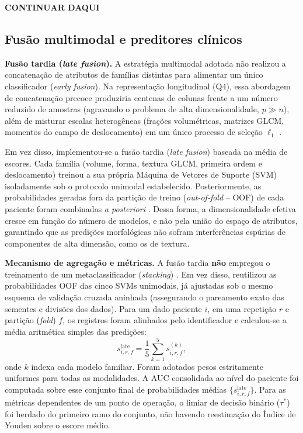 \documentclass[review]{elsarticle}
\newcommand{\sugestao}[2]{%
	\textcolor{red}{\sout{\textbf{#1}}}%
	\textcolor{blue!100!black}{\textbf{#2}}%
}
\begin{document}
\sugestao{}{CONTINUAR DAQUI}

\subsection{Fusão multimodal e preditores clínicos}
\label{sec:fusao}

\textbf{Fusão tardia (\emph{late fusion}).} A estratégia multimodal adotada não realizou a concatenação de atributos de famílias distintas para alimentar um único classificador (\emph{early fusion}). Na representação longitudinal (Q4), essa abordagem de concatenação precoce produziria centenas de colunas frente a um número reduzido de amostras (agravando o problema de alta dimensionalidade, $p \gg n$), além de misturar escalas heterogêneas (frações volumétricas, matrizes GLCM, momentos do campo de deslocamento) em um único processo de seleção $\ell_1$ \cite{kittler-1998,kuncheva-2004}. 

Em vez disso, implementou-se a fusão tardia (\emph{late fusion}) baseada na média de escores. Cada família (volume, forma, textura GLCM, primeira ordem e deslocamento) treinou a sua própria Máquina de Vetores de Suporte (SVM) isoladamente sob o protocolo unimodal estabelecido. Posteriormente, as probabilidades geradas fora da partição de treino (\emph{out-of-fold} -- OOF) de cada paciente foram combinadas \emph{a posteriori} \cite{kittler-1998,dietterich-2000}. Dessa forma, a dimensionalidade efetiva cresce em função do número de modelos, e não pela união do espaço de atributos, garantindo que as predições morfológicas não sofram interferências espúrias de componentes de alta dimensão, como os de textura.

\textbf{Mecanismo de agregação e métricas.} A fusão tardia \textbf{não} empregou o treinamento de um metaclassificador (\emph{stacking}) \cite{wolpert-1992}. Em vez disso, reutilizou as probabilidades OOF das cinco SVMs unimodais, já ajustadas sob o mesmo esquema de validação cruzada aninhada (assegurando o pareamento exato das sementes e divisões dos dados). Para um dado paciente $i$, em uma repetição $r$ e partição (\emph{fold}) $f$, os registros foram alinhados pelo identificador e calculou-se a média aritmética simples das predições:
\begin{equation}
	s_{i,r,f}^{\mathrm{late}} = \frac{1}{5}\sum_{k=1}^{5} s_{i,r,f}^{(k)},
	\label{eq:late-mean}
\end{equation}
onde $k$ indexa cada modelo familiar. Foram adotados pesos estritamente uniformes para todas as modalidades. A AUC consolidada ao nível do paciente foi computada sobre esse conjunto final de probabilidades médias $\{s_{i,r,f}^{\mathrm{late}}\}$. Para as métricas dependentes de um ponto de operação, o limiar de decisão binário ($\tau^{*}$) foi herdado do primeiro ramo do conjunto, não havendo reestimação do Índice de Youden sobre o escore médio.
\end{document}
